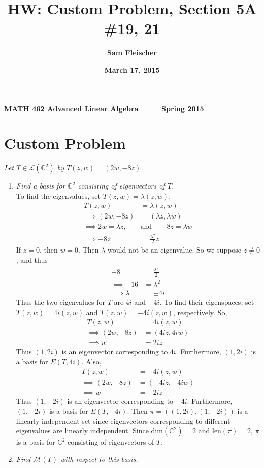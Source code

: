 \documentclass[12pt]{article}
\title{\bf HW: Custom Problem, Section 5A \#19, 21}
\author{\bf Sam Fleischer}
\date{\bf March 17, 2015}
\begin{document}
{\bf MATH 462 \hfill Advanced Linear Algebra \ \ \ \ \ \hfill Spring 2015} 

{\let\newpage\relax\maketitle}

\section*{Custom Problem}
{\it Let $T \in \mathcal{L}(\mathbb{C}^2)$ by $T(z, w) = (2w, -8z)$.}
	\begin{enumerate}[\it\ \ (a)\ \ ]
		\item {\it Find a basis for $\mathbb{C}^2$ consisting of eigenvectors of $T$.}\\
		
		\noindent To find the eigenvalues, set $T(z, w) = \lambda(z, w)$.
		\begin{align*}
			T(z, w) &= \lambda(z, w) \\
			\implies (2w, -8z) &= (\lambda z, \lambda w) \\
			\implies 2w = \lambda z\text{,} \ \ \ \ &\text{and}\ \ \ \ -8z = \lambda w \\
			\implies -8z &= \frac{\lambda^2}{2}z
		\end{align*}
		If $z = 0$, then $w = 0$.  Then $\lambda$ would not be an eigenvalue.  So we suppose $z \neq 0$, and thus
		\begin{align*}
			-8 &= \frac{\lambda^2}{2} \\
			\implies -16 &= \lambda^2 \\
			\implies \lambda &= \pm 4i
		\end{align*}
		Thus the two eigenvalues for $T$ are $4i$ and $-4i$.  To find their eigenspaces, set $T(z, w) = 4i(z, w)$ and $T(z, w) = -4i(z, w)$, respectively.  So,
		\begin{align*}
			T(z, w) &= 4i(z, w) \\
			\implies (2w, -8z) &= (4iz, 4iw) \\
			\implies w &= 2iz
		\end{align*}
		Thus $(1, 2i)$ is an eigenvector corresponding to $4i$.  Furthermore, $(1, 2i)$ is a basis for $E(T, 4i)$.  Also,
		\begin{align*}
			T(z, w) &= -4i(z, w) \\
			\implies (2w, -8z) &= (-4iz, -4iw) \\
			\implies w &= -2iz
		\end{align*}
		Thus $(1, -2i)$ is an eigenvector corresponding to $-4i$.  Furthermore, $(1, -2i)$ is a basis for $E(T, -4i)$.  Then $\pi = ((1, 2i), (1, -2i))$ is a linearly independent set since eigenvectors corresponding to different eigenvalues are linearly independent.  Since $\text{dim}(\mathbb{C}^2) = 2$ and $\text{len}(\pi) = 2$, $\pi$ is a basis for $\mathbb{C}^2$ consisting of eigenvectors of $T$.
		\item {\it Find $\mathcal{M}(T)$ with respect to this basis.}\\
		

\end{enumerate}
\end{document}
